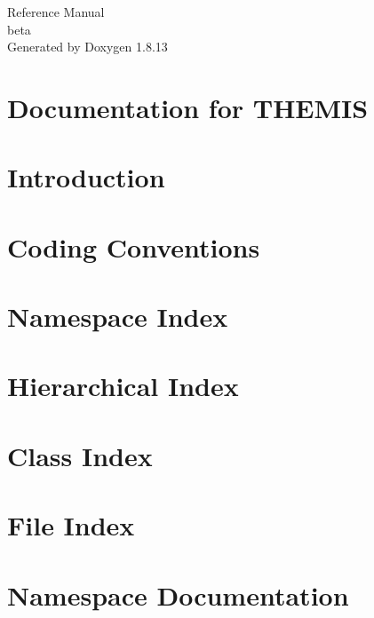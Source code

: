 \documentclass[twoside]{book}
\newcommand{\+}{\discretionary{\mbox{\scriptsize$\hookleftarrow$}}{}{}}
\newcommand{\clearemptydoublepage}{%
  \newpage{\pagestyle{empty}\cleardoublepage}%
}
\begin{document}
\hypersetup{pageanchor=false,
             bookmarksnumbered=true,
             pdfencoding=unicode
            }
\begin{titlepage}
\vspace*{7cm}
\begin{center}%
{\Large Reference Manual\\[1ex]\large beta }\\
\vspace*{1cm}
{\large Generated by Doxygen 1.8.13}\\
\end{center}
\end{titlepage}
\clearemptydoublepage
{}
\tableofcontents
\clearemptydoublepage
{}
\hypersetup{pageanchor=true}

\chapter{Documentation for T\+H\+E\+M\+IS}
\label{index}\hypertarget{index}{}
\chapter{Introduction}
\label{intro}

\chapter{Coding Conventions}
\label{conv}

\chapter{Namespace Index}

\chapter{Hierarchical Index}

\chapter{Class Index}

\chapter{File Index}

\chapter{Namespace Documentation}



















\end{document}
